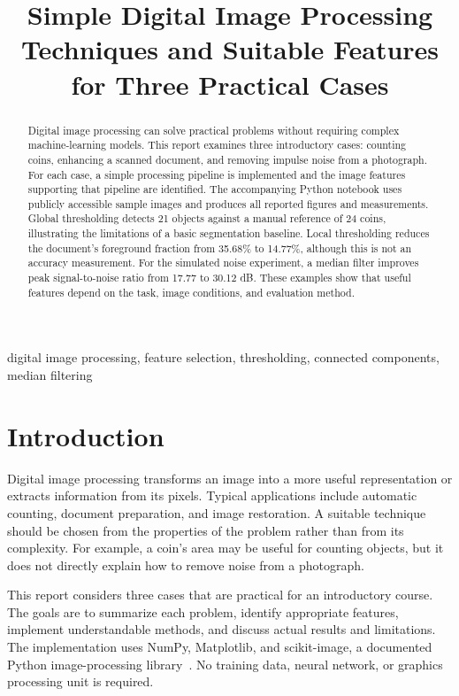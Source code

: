 \documentclass[conference]{IEEEtran}
\title{Simple Digital Image Processing Techniques and Suitable Features for Three Practical Cases}
\author{\IEEEauthorblockN{Student Name}
\IEEEauthorblockA{Digital Image Processing Course\\University / Department}}
\begin{document}
\maketitle
\begin{abstract}
Digital image processing can solve practical problems without requiring complex machine-learning models. This report examines three introductory cases: counting coins, enhancing a scanned document, and removing impulse noise from a photograph. For each case, a simple processing pipeline is implemented and the image features supporting that pipeline are identified. The accompanying Python notebook uses publicly accessible sample images and produces all reported figures and measurements. Global thresholding detects 21 objects against a manual reference of 24 coins, illustrating the limitations of a basic segmentation baseline. Local thresholding reduces the document's foreground fraction from 35.68\% to 14.77\%, although this is not an accuracy measurement. For the simulated noise experiment, a median filter improves peak signal-to-noise ratio from 17.77 to 30.12 dB. These examples show that useful features depend on the task, image conditions, and evaluation method.
\end{abstract}
\begin{IEEEkeywords}
digital image processing, feature selection, thresholding, connected components, median filtering
\end{IEEEkeywords}

\section{Introduction}
Digital image processing transforms an image into a more useful representation or extracts information from its pixels. Typical applications include automatic counting, document preparation, and image restoration. A suitable technique should be chosen from the properties of the problem rather than from its complexity. For example, a coin's area may be useful for counting objects, but it does not directly explain how to remove noise from a photograph.

This report considers three cases that are practical for an introductory course. The goals are to summarize each problem, identify appropriate features, implement understandable methods, and discuss actual results and limitations. The implementation uses NumPy, Matplotlib, and scikit-image, a documented Python image-processing library~\cite{skimage2014}. No training data, neural network, or graphics processing unit is required.
\end{document}
